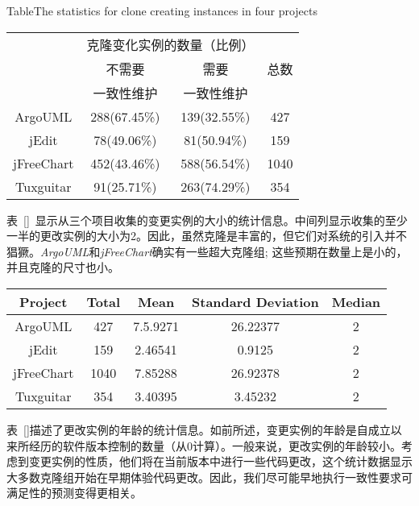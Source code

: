 \begin{table}[htbp]
{Table$\!$}{The statistics for clone creating instances in four projects}
\vspace{0.5em}
\centering
\wuhao
\begin{tabular}{cccc}
\toprule[1.5pt]
~\multirow{3}{*}{实验系统}& \multicolumn{2}{c}{克隆变化实例的数量（比例）} & \multirow{3}{*}{总数}\\ 
 \cline{2-3}
~&{不需要} &{需要} &  ~\\
~&{一致性维护}&{一致性维护}&~ \\
\midrule[1pt]
ArgoUML&288(67.45\%)&139(32.55\%)&427\\
jEdit&78(49.06\%)&81(50.94\%)&159\\
jFreeChart&452(43.46\%)&588(56.54\%)&1040\\
Tuxguitar&91(25.71\%)&263(74.29\%)&354\\
\bottomrule[1.5pt]
\end{tabular}
\end{table}

表~\ref{}~显示从三个项目收集的变更实例的大小的统计信息。中间列显示收集的至少一半的更改实例的大小为2。因此，虽然克隆是丰富的，但它们对系统的引入并不猖獗。{\em  ArgoUML}和{\em jFreeChart}确实有一些超大克隆组; 这些预期在数量上是小的，并且克隆的尺寸也小。

\begin{table}[htbp]
\vspace{0.5em}\centering\wuhao
\begin{tabular}{ccccc}
\toprule[1.5pt]
\textbf{Project}&\textbf{Total}&\textbf{Mean}&\textbf{Standard Deviation}&\textbf{Median}\\ \hline
\midrule[1pt]
ArgoUML&427&7.5.9271&	26.22377&2\\ \hline
jEdit&159&	2.46541&	0.9125&2\\ \hline
jFreeChart&1040&	7.85288&	26.92378&2\\ \hline
Tuxguitar&354&	3.40395	&3.45232&2\\ 
\bottomrule[1.5pt]
\end{tabular}
\end{table}

表~\ref{}描述了更改实例的年龄的统计信息。如前所述，变更实例的年龄是自成立以来所经历的软件版本控制的数量（从$ 0 $计算）。一般来说，更改实例的年龄较小。考虑到变更实例的性质，他们将在当前版本中进行一些代码更改，这个统计数据显示大多数克隆组开始在早期体验代码更改。因此，我们尽可能早地执行一致性要求可满足性的预测变得更相关。

